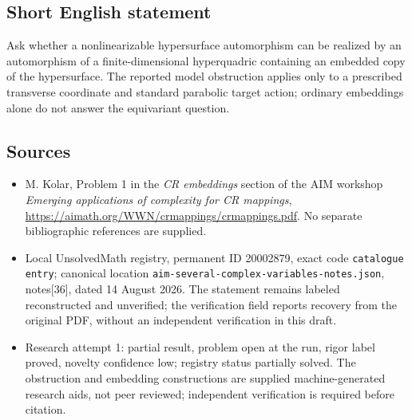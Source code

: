 \documentclass[11pt]{article}
\begin{document}
\subsection{Short English statement}
Ask whether a nonlinearizable hypersurface automorphism can be realized by an automorphism of a finite-dimensional hyperquadric containing an embedded copy of the hypersurface. The reported model obstruction applies only to a prescribed transverse coordinate and standard parabolic target action; ordinary embeddings alone do not answer the equivariant question.
\subsection{Sources}
\begin{itemize}
\item M. Kolar, Problem 1 in the \emph{CR embeddings} section of the AIM workshop \emph{Emerging applications of complexity for CR mappings}, \url{https://aimath.org/WWN/crmappings/crmappings.pdf}. No separate bibliographic references are supplied.
\item Local UnsolvedMath registry, permanent ID 20002879, exact code \texttt{catalogue entry}; canonical location \texttt{aim-several-complex-variables-notes.json}, notes[36], dated 14 August 2026. The statement remains labeled reconstructed and unverified; the verification field reports recovery from the original PDF, without an independent verification in this draft.
\item Research attempt 1: partial result, problem open at the run, rigor label proved, novelty confidence low; registry status partially solved. The obstruction and embedding constructions are supplied machine-generated research aids, not peer reviewed; independent verification is required before citation.
\end{itemize}
\end{document}
